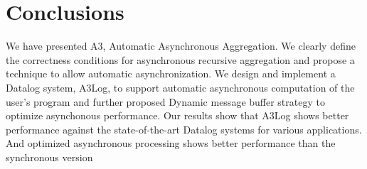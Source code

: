 \section{Conclusions}
\label{sec:conclusion}
We have presented A3, Automatic Asynchronous Aggregation. We clearly define the correctness conditions for asynchronous recursive aggregation and propose a technique to allow automatic asynchronization. We design and implement a Datalog system, A3Log, to support automatic asynchronous computation of the user's program and further proposed Dynamic message buffer strategy to optimize asynchonous performance. Our results show that A3Log shows better performance against the state-of-the-art Datalog systems for various applications. And optimized asynchronous processing shows better performance than the  synchronous version

